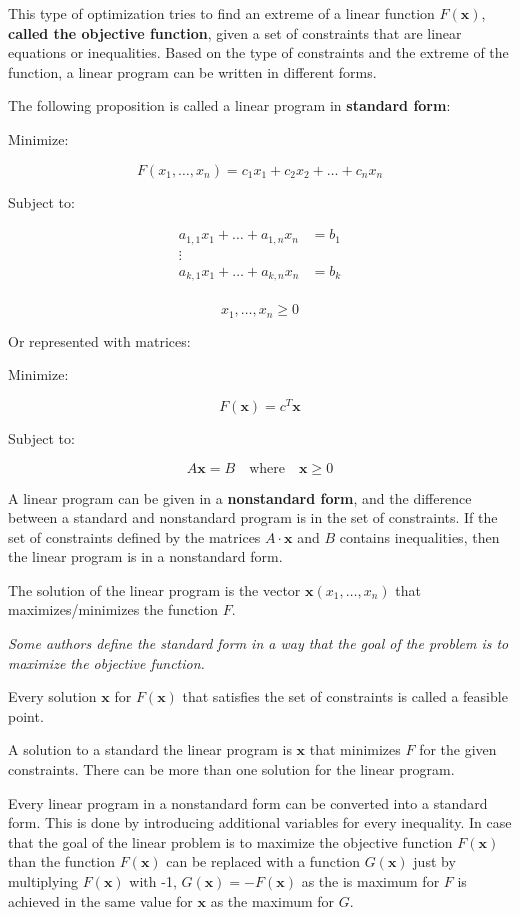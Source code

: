 \documentclass[11pt]{article}
\begin{document}
    This type of optimization tries to find an extreme of a linear function
\(F(\pmb{x})\), \textbf{called the objective function}, given a set of
constraints that are linear equations or inequalities. Based on the type
of constraints and the extreme of the function, a linear program can be
written in different forms.

The following proposition is called a linear program in \textbf{standard
form}:

Minimize:

\[
F(x_1, \ldots, x_n) = c_1 x_1 + c_2 x_2 + \ldots + c_n x_n
\]

Subject to:

\[
\begin{aligned}
a_{1,1}x_1 + \ldots + a_{1,n}x_n &= b_1 \\
\vdots \\
a_{k,1}x_1 + \ldots + a_{k,n}x_n &= b_k \\
\end{aligned}
\]

\[
x_1, \ldots, x_n \geq 0
\]

Or represented with matrices:

Minimize:

\[
F(\pmb{x}) = c^T \pmb{x}
\]

Subject to:

\[
A\pmb{x} = B \quad \text{where} \quad \pmb{x} \geq 0
\]

A linear program can be given in a \textbf{nonstandard form}, and the
difference between a standard and nonstandard program is in the set of
constraints. If the set of constraints defined by the matrices
\(A \cdot \pmb{x}\) and \(B\) contains inequalities, then the linear
program is in a nonstandard form.

The solution of the linear program is the vector
\(\pmb{x}(x_1, \ldots, x_n)\) that maximizes/minimizes the function
\(F\).

\emph{Some authors define the standard form in a way that the goal of
the problem is to maximize the objective function.}

Every solution \(\pmb{x}\) for \(F(\pmb{x})\) that satisfies the set of
constraints is called a feasible point.

A solution to a standard the linear program is \(\pmb{x}\) that
minimizes \(F\) for the given constraints. There can be more than one
solution for the linear program.

Every linear program in a nonstandard form can be converted into a
standard form. This is done by introducing additional variables for
every inequality. In case that the goal of the linear problem is to
maximize the objective function \(F(\pmb{x})\) than the function
\(F(\pmb{x})\) can be replaced with a function \(G(\pmb{x})\) just by
multiplying \(F(\pmb{x})\) with -1, \(G(\pmb{x})=-F(\pmb{x})\) as the is
maximum for \(F\) is achieved in the same value for \(\pmb{x}\) as the
maximum for \(G\).
\end{document}
